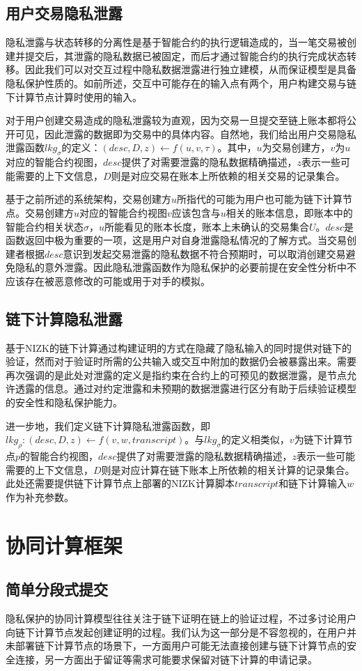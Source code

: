 \subsection{用户交易隐私泄露}
隐私泄露与状态转移的分离性是基于智能合约的执行逻辑造成的，当一笔交易被创建并提交后，其泄露的隐私数据已被固定，而后才通过智能合约的执行完成状态转移。因此我们可以对交互过程中隐私数据泄露进行独立建模，从而保证模型是具备隐私保护性质的。如前所述，交互中可能存在的输入点有两个，用户构建交易与链下计算节点计算时使用的输入。

对于用户创建交易造成的隐私泄露较为直观，因为交易一旦提交至链上账本都将公开可见，因此泄露的数据即为交易中的具体内容。自然地，我们给出用户交易隐私泄露函数${lkg}_\sigma$的定义：$(desc, D, z) \leftarrow f(u, v, \tau)$。其中，$u$为交易创建方，$v$为$u$对应的智能合约视图，$desc$提供了对需要泄露的隐私数据精确描述，$z$表示一些可能需要的上下文信息，$D$则是对应交易在账本上所依赖的相关交易的记录集合。

基于之前所述的系统架构，交易创建方$u$所指代的可能为用户也可能为链下计算节点。交易创建方$u$对应的智能合约视图$v$应该包含与$u$相关的账本信息，即账本中的智能合约相关状态$\sigma$，$u$所能看见的账本长度，账本上未确认的交易集合$U$。$desc$是函数返回中极为重要的一项，这是用户对自身泄露隐私情况的了解方式。当交易创建者根据$desc$意识到发起交易泄露的隐私数据不符合预期时，可以取消创建交易避免隐私的意外泄露。因此隐私泄露函数作为隐私保护的必要前提在安全性分析中不应该存在被恶意修改的可能或用于对手的模拟。
\subsection{链下计算隐私泄露}
基于NIZK的链下计算通过构建证明的方式在隐藏了隐私输入的同时提供对链下的验证，然而对于验证时所需的公共输入或交互中附加的数据仍会被暴露出来。需要再次强调的是此处对泄露的定义是指约束在合约上的可预见的数据泄露，是节点允许透露的信息。通过对约定泄露和未预期的数据泄露进行区分有助于后续验证模型的安全性和隐私保护能力。

进一步地，我们定义链下计算隐私泄露函数，即${lkg}_\rho:(desc, D, z) \leftarrow f(v, w, transcript)$。与${lkg}_\sigma$的定义相类似，$v$为链下计算节点$p$的智能合约视图，$desc$提供了对需要泄露的隐私数据精确描述，$z$表示一些可能需要的上下文信息，$D$则是对应计算在链下账本上所依赖的相关计算的记录集合。此处还需要提供链下计算节点上部署的NIZK计算脚本$transcript$和链下计算输入$w$作为补充参数。
\section{协同计算框架}
\subsection{简单分段式提交}
隐私保护的协同计算模型往往关注于链下证明在链上的验证过程，不过多讨论用户向链下计算节点发起创建证明的过程。我们认为这一部分是不容忽视的，在用户并未部署链下计算节点的场景下，一方面用户可能无法直接创建与链下计算节点的安全连接，另一方面出于留证等需求可能要求保留对链下计算的申请记录。

